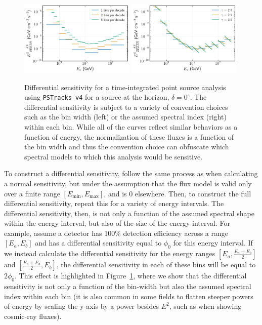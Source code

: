 \documentclass[a4paper,11pt]{article}
\begin{document}
\begin{figure}
    \centering
    \includegraphics[width=0.49\textwidth]{figures/differential_sens_bin_width.png}
    \includegraphics[width=0.49\textwidth]{figures/differential_injected_index.png}
    \caption{Differential sensitivity for a time-integrated point source analysis using \texttt{PSTracks\_v4} for a source at the horizon, $\delta=0^{\circ}$. The differential sensitivity is subject to a variety of convention choices such as the bin width (left) or the assumed spectral index (right) within each bin. While all of the curves reflect similar behaviors as a function of energy, the normalization of these fluxes is a function of the bin width and thus the convention choice can obfuscate which spectral models to which this analysis would be sensitive.}
    \label{fig:diff_sens_conventions}
\end{figure}

To construct a differential sensitivity, follow the same process as when calculating a normal sensitivity, but under the assumption that the flux model is valid only over a finite range $[E_{\mathrm{min}}, E_{\mathrm{max}}]$, and is 0 elsewhere. Then, to construct the full differential sensitivity, repeat this for a variety of energy intervals. The differential sensitivity, then, is not only a function of the assumed spectral shape within the energy interval, but also of the size of the energy interval. For example, assume a detector has 100\% detection efficiency across a range $[E_a, E_b]$ and has a differential sensitivity equal to $\phi_0$ for this energy interval. If we instead calculate the differential sensitivity for the energy ranges  $[E_a, \frac{E_a + E_b}{2}]$ and $[\frac{E_a + E_b}{2}, E_b]$, the differential sensitivity in each of these bins will be equal to $2\phi_0$. This effect is highlighted in Figure~\ref{fig:diff_sens_conventions}, where we show that the differential sensitivity is not only a function of the bin-width but also the assumed spectral index within each bin (it is also common in some fields to flatten steeper powers of energy by scaling the y-axis by a power besides $E^2$, such as when showing cosmic-ray fluxes).
\end{document}
